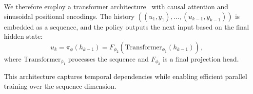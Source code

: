 \documentclass[conference]{IEEEtran}
\begin{document}
We therefore employ a transformer architecture~\citep{vaswani2017attention} with causal attention and sinusoidal positional encodings. The history $((u_1, y_1), \ldots, (u_{k-1}, y_{k-1}))$ is embedded as a sequence, and the policy outputs the next input based on the final hidden state:
\begin{equation}
u_k = \pi_\phi(h_{k-1}) = F_{\phi_2}(\text{Transformer}_{\phi_1}(h_{k-1})),
\end{equation}
where $\text{Transformer}_{\phi_1}$ processes the sequence and $F_{\phi_2}$ is a final projection head.

This architecture captures temporal dependencies while enabling efficient parallel training over the sequence dimension.

\appendix




\end{document}
